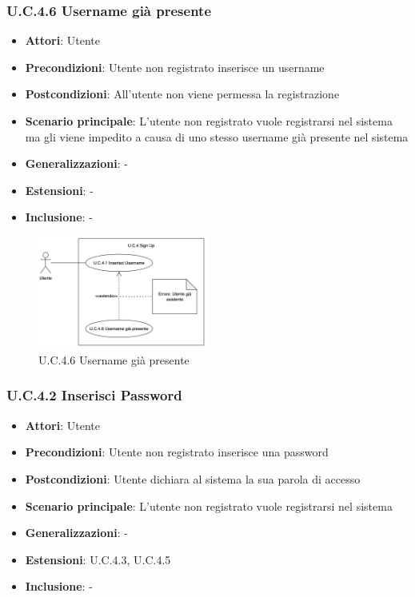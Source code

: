 \subsubsection{U.C.4.6 Username già presente}
\begin{itemize}
    \item \textbf{Attori}: Utente
    \item \textbf{Precondizioni}: Utente non registrato inserisce un username
    \item \textbf{Postcondizioni}: All'utente non viene permessa la registrazione
    \item \textbf{Scenario principale}: L’utente non registrato vuole registrarsi nel sistema ma gli viene impedito a causa di uno stesso username già presente nel sistema
    \item \textbf{Generalizzazioni}: -
    \item \textbf{Estensioni}: -
    \item \textbf{Inclusione}: -
\end{itemize}
\begin{figure}[h!]
    \centering
    \includegraphics[width=0.5\textwidth]{img/UC4-6.png}
    \caption{U.C.4.6 Username già presente}
\end{figure}
\subsubsection{U.C.4.2 Inserisci Password}
\begin{itemize}
    \item \textbf{Attori}: Utente
    \item \textbf{Precondizioni}: Utente non registrato inserisce una password
    \item \textbf{Postcondizioni}: Utente dichiara al sistema la sua parola di accesso
    \item \textbf{Scenario principale}: L’utente non registrato vuole registrarsi nel sistema
    \item \textbf{Generalizzazioni}: -
    \item \textbf{Estensioni}: U.C.4.3, U.C.4.5
    \item \textbf{Inclusione}: -
\end{itemize}
